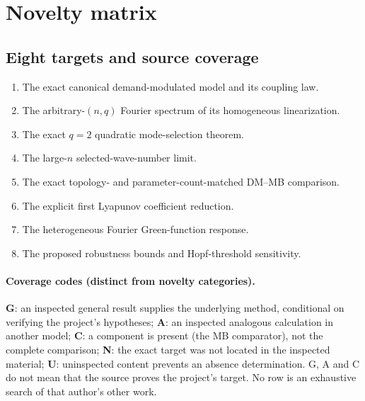 \section{Novelty matrix}
\label{sec:novelty-matrix}

\subsection{Eight targets and source coverage}
\begin{enumerate}[label=\textbf{T\arabic*.}]
\item The exact canonical demand-modulated model and its coupling law.
\item The arbitrary-$(n,q)$ Fourier spectrum of its homogeneous linearization.
\item The exact $q=2$ quadratic mode-selection theorem.
\item The large-$n$ selected-wave-number limit.
\item The exact topology- and parameter-count-matched DM--MB comparison.
\item The explicit first Lyapunov coefficient reduction.
\item The heterogeneous Fourier Green-function response.
\item The proposed robustness bounds and Hopf-threshold sensitivity.
\end{enumerate}

\paragraph{Coverage codes (distinct from novelty categories).}
\textbf{G}: an inspected general result supplies the underlying method,
conditional on verifying the project's hypotheses;
\textbf{A}: an inspected analogous calculation in another model;
\textbf{C}: a component is present (the MB comparator), not the complete
comparison;
\textbf{N}: the exact target was not located in the inspected material;
\textbf{U}: uninspected content prevents an absence determination.
G, A and C do not mean that the source proves the project's target.
No row is an exhaustive search of that author's other work.


